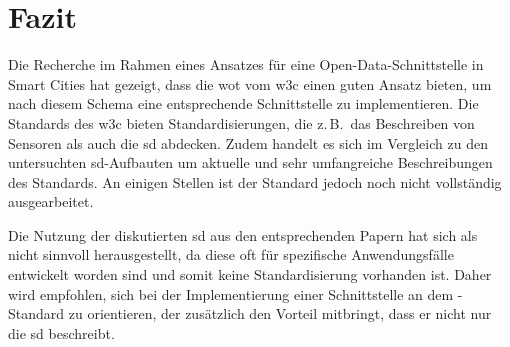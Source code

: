 \section{Fazit}\label{sec:conclusion}

Die Recherche im Rahmen eines Ansatzes für eine Open-Data-Schnittstelle in Smart Cities hat gezeigt, dass die \gls{wot} vom \gls{w3c} einen guten Ansatz bieten, um nach diesem Schema eine entsprechende Schnittstelle zu implementieren. Die Standards des \gls{w3c} bieten Standardisierungen, die z.\,B.\ das Beschreiben von Sensoren als auch die \gls{sd} abdecken. Zudem handelt es sich im Vergleich zu den untersuchten \gls{sd}-Aufbauten um aktuelle und sehr umfangreiche Beschreibungen des Standards. An einigen Stellen ist der Standard jedoch noch nicht vollständig ausgearbeitet.

Die Nutzung der diskutierten \gls{sd} aus den entsprechenden Papern hat sich als nicht sinnvoll herausgestellt, da diese oft für spezifische Anwendungsfälle entwickelt worden sind und somit keine Standardisierung vorhanden ist. Daher wird empfohlen, sich bei der Implementierung einer Schnittstelle an dem -Standard zu orientieren, der zusätzlich den Vorteil mitbringt, dass er nicht nur die \gls{sd} beschreibt.
